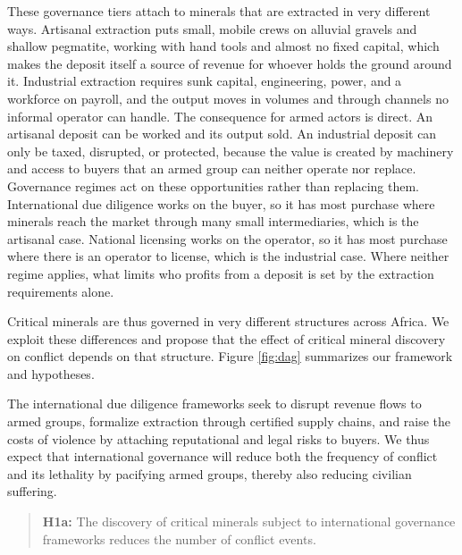 \documentclass[11pt]{article}
\begin{document}
These governance tiers attach to minerals that are extracted in very different ways. Artisanal extraction puts small, mobile crews on alluvial gravels and shallow pegmatite, working with hand tools and almost no fixed capital, which makes the deposit itself a source of revenue for whoever holds the ground around it. Industrial extraction requires sunk capital, engineering, power, and a workforce on payroll, and the output moves in volumes and through channels no informal operator can handle. The consequence for armed actors is direct. An artisanal deposit can be worked and its output sold. An industrial deposit can only be taxed, disrupted, or protected, because the value is created by machinery and access to buyers that an armed group can neither operate nor replace. Governance regimes act on these opportunities rather than replacing them. International due diligence works on the buyer, so it has most purchase where minerals reach the market through many small intermediaries, which is the artisanal case. National licensing works on the operator, so it has most purchase where there is an operator to license, which is the industrial case. Where neither regime applies, what limits who profits from a deposit is set by the extraction requirements alone.

Critical minerals are thus governed in very different structures across Africa. We exploit these differences and propose that the effect of critical mineral discovery on conflict depends on that structure. Figure \ref{fig:dag} summarizes our framework and hypotheses.


The international due diligence frameworks seek to disrupt revenue flows to armed groups, formalize extraction through certified supply chains, and raise the costs of violence by attaching reputational and legal risks to buyers. We thus expect that international governance will reduce both the frequency of conflict and its lethality by pacifying armed groups, thereby also reducing civilian suffering.

\begin{quote}
\textbf{H1a:} The discovery of critical minerals subject to international governance frameworks reduces the number of conflict events.
\end{quote}
\end{document}

